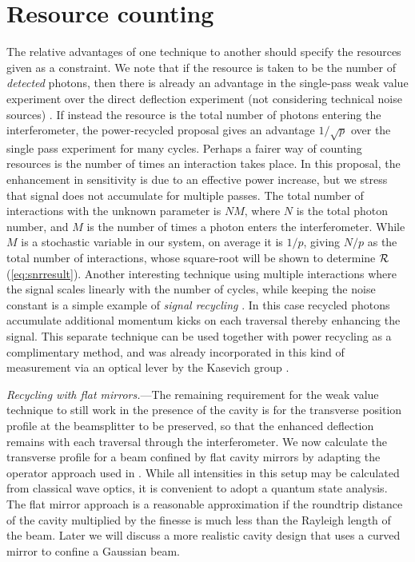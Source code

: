 \section{Resource counting}
The relative advantages of one technique to another should specify the resources given as a constraint.  We note that if the resource is taken to be the number of {\it detected} photons, then there is already an advantage in the single-pass weak value experiment over the direct deflection experiment (not considering technical noise sources) \cite{Dixon2009, Starling2009}.  If instead the resource is the total number of photons entering the interferometer, the power-recycled proposal gives an advantage $1/\sqrt{p}$ over the single pass experiment for many cycles. %
Perhaps a fairer way of counting resources is the number of times an interaction takes place.  In this proposal, the enhancement in sensitivity is due to an effective power increase, but we stress that signal does not accumulate for multiple passes.  The total number of interactions with the unknown parameter is $N M$, where $N$ is the total photon number, and $M$ is the number of times a photon enters the interferometer.  While $M$ is a stochastic variable in our system, on average it is $1/p$, giving $N/p$ as the total number of interactions, whose square-root will be shown to determine ${\cal R}$ (\ref{eq:snrresult}).
Another interesting technique using multiple interactions where the signal scales linearly with the number of cycles,
while keeping the noise constant is a simple example of {\it signal recycling} \cite{Meers1991}.  In this case recycled photons accumulate additional momentum kicks on each traversal thereby enhancing the signal. This separate technique can be used together with power recycling as a complimentary method, and was already incorporated in this kind of measurement via an optical lever by the Kasevich group \cite{Hogan2011}.

{\it Recycling with flat mirrors.}---The remaining requirement for the weak value technique to still work in the presence of the cavity is for the transverse position profile at the beamsplitter to be preserved, so that the enhanced deflection remains with each traversal through the interferometer.  We now calculate the transverse profile for a beam confined by flat cavity mirrors by adapting the operator approach used in \cite{Dressel2013}.  While all intensities in this setup may be calculated from classical wave optics, it is convenient to adopt a quantum state analysis. The flat mirror approach is a reasonable approximation if the roundtrip distance of the cavity multiplied by the finesse is much less than the Rayleigh length of the beam. Later we will discuss a more realistic cavity design that uses a curved mirror to confine a Gaussian beam.

